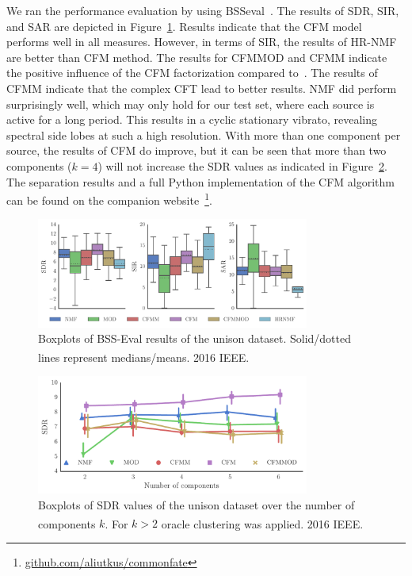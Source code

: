 We ran the performance evaluation by using BSSeval~\cite{vincent06}. 
The results of \acs{SDR}, \ac{SIR}, and \ac{SAR} are depicted in Figure~\ref{fig:boxplot_overall}. 
Results indicate that the CFM model performs well in all measures. 
However, in terms of \acs{SIR}, the results of HR-NMF are better than CFM method. 
The results for CFMMOD and CFMM indicate the positive influence of the CFM factorization compared to~\cite{barker13}.
The results of CFMM indicate that the complex CFT lead to better results. 
\acs{NMF} did perform surprisingly well, which may only hold for our test set, where each source is active for a long period. 
This results in a cyclic stationary vibrato, revealing spectral side lobes at such a high resolution. 
With more than one component per source, the results of CFM do improve, but it can be seen that more than two components ($k=4$) will not increase the \acs{SDR} values as indicated in Figure~\ref{fig:iterations}. 
The separation results and a full Python implementation of the CFM algorithm can be found on the companion website~\footnote{\url{github.com/aliutkus/commonfate}}.

\begin{figure}[ht!]
\centering
        \includegraphics[width=0.8\textwidth]{Chapters/06_Separation_Unknown/figures/cfm_boxplot.pdf}
\caption{Boxplots of BSS-Eval results of the unison dataset. Solid/dotted lines represent medians/means. \textsuperscript{\textregistered}2016 IEEE.}
\label{fig:boxplot_overall}
\end{figure}

\begin{figure}[ht!]
\centering
        \includegraphics[width=0.8\textwidth]{Chapters/06_Separation_Unknown/figures/iterations.pdf}
\caption{Boxplots of \acs{SDR} values of the unison dataset over the number of components $k$. For $k>2$ oracle clustering was applied. \textsuperscript{\textregistered}2016 IEEE.}
\label{fig:iterations}
\end{figure}

